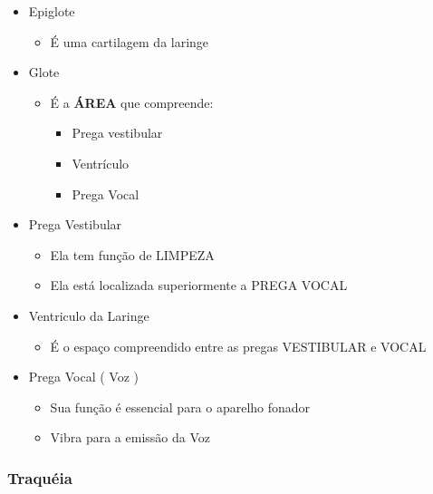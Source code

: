 \documentclass[
]{book}
\providecommand{\tightlist}{%
  \setlength{\itemsep}{0pt}\setlength{\parskip}{0pt}}
\begin{document}
\begin{itemize}
\tightlist
\item
  Epiglote

  \begin{itemize}
  \tightlist
  \item
    É uma cartilagem da laringe
  \end{itemize}
\item
  Glote

  \begin{itemize}
  \tightlist
  \item
    É a \textbf{ÁREA} que compreende:

    \begin{itemize}
    \tightlist
    \item
      Prega vestibular
    \item
      Ventrículo
    \item
      Prega Vocal
    \end{itemize}
  \end{itemize}
\item
  Prega Vestibular

  \begin{itemize}
  \tightlist
  \item
    Ela tem função de LIMPEZA
  \item
    Ela está localizada superiormente a PREGA VOCAL
  \end{itemize}
\item
  Ventriculo da Laringe

  \begin{itemize}
  \tightlist
  \item
    É o espaço compreendido entre as pregas VESTIBULAR e VOCAL
  \end{itemize}
\item
  Prega Vocal ( Voz )

  \begin{itemize}
  \tightlist
  \item
    Sua função é essencial para o aparelho fonador
  \item
    Vibra para a emissão da Voz
  \end{itemize}
\end{itemize}

\hypertarget{traquuxe9ia}{%
\subsubsection{Traquéia}\label{traquuxe9ia}}
\end{document}
